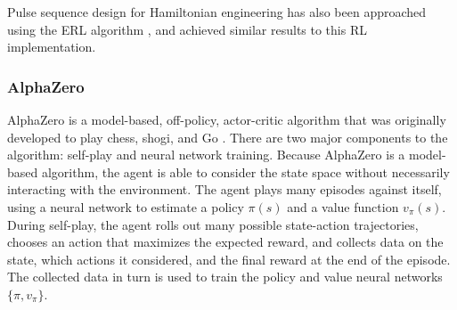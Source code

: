 Pulse sequence design for Hamiltonian engineering has also been approached using the ERL algorithm \cite{peng2021deep}, and achieved similar results to this RL implementation.

\subsubsection{AlphaZero}

AlphaZero is a model-based, off-policy, actor-critic algorithm that was originally developed to play chess, shogi, and Go \cite{Silver1140}. There are two major components to the algorithm: self-play and neural network training. Because AlphaZero is a model-based algorithm, the agent is able to consider the state space without necessarily interacting with the environment. The agent plays many episodes against itself, using a neural network to estimate a policy $\pi(s)$ and a value function $v_\pi(s)$. During self-play, the agent rolls out many possible state-action trajectories, chooses an action that maximizes the expected reward, and collects data on the state, which actions it considered, and the final reward at the end of the episode. The collected data in turn is used to train the policy and value neural networks $\{ \pi, v_\pi \}$.
